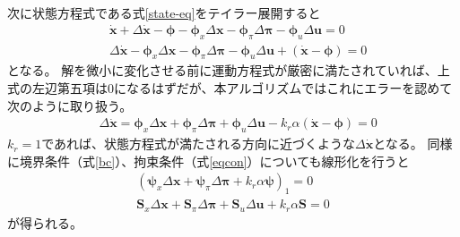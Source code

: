 \documentclass[a4paper]{bxjsarticle}
\begin{document}
	次に状態方程式である式\eqref{state-eq}をテイラー展開すると
	\begin{align}
		&\dot{\bm{x}}  + \Delta \dot{\bm{x}} - \bm{\phi}  - \bm{\phi}_x\Delta \bm{x}  - \bm{\phi}_\pi \Delta \bm{\pi} -\bm{\phi}_u \Delta \bm{u} \nonumber  = 0\\
		&\Delta \dot{\bm{x}} - \bm{\phi}_x\Delta \bm{x}  - \bm{\phi}_\pi \Delta \bm{\pi}-\bm{\phi}_u \Delta \bm{u} + (\dot{\bm{x}} - \bm{\phi} )  = 0	
	\end{align}
	となる。
	解を微小に変化させる前に運動方程式が厳密に満たされていれば、上式の左辺第五項は0になるはずだが、本アルゴリズムではこれにエラーを認めて次のように取り扱う。
	\begin{align}
		&\Delta \dot{\bm{x}} = \bm{\phi}_x\Delta \bm{x}  + \bm{\phi}_\pi \Delta \bm{\pi}+\bm{\phi}_u \Delta \bm{u} - k_r \alpha (\dot{\bm{x}} - \bm{\phi} )  = 0	
	\end{align}
	$k_r=1$であれば、状態方程式が満たされる方向に近づくような$\Delta \dot{\bm{x}}$となる。
	同様に境界条件（式\eqref{bc}）、拘束条件（式\eqref{eqcon}）についても線形化を行うと
	\begin{align}
		(\bm{\psi}_x \Delta \bm{x} + \bm{\psi}_\pi \Delta \bm{\pi} + k_r \alpha \bm{\psi})_1 = 0 \\
		\bm{S}_x \Delta \bm{x} + \bm{S}_\pi \Delta \bm{\pi} + \bm{S}_u \Delta \bm{u} + k_r \alpha \bm{S} = 0
	\end{align}
	が得られる。
	
\end{document}
